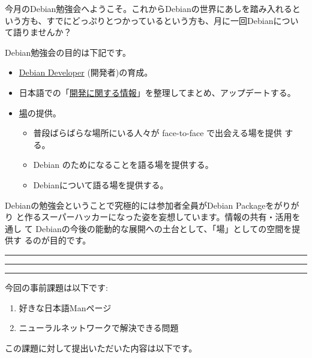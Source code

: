 \documentclass[mingoth,a4paper]{jsarticle}
\begin{document}
\begin{multicols}{2}
 
 
 今月のDebian勉強会へようこそ。これからDebianの世界にあしを踏み入れると
 いう方も、すでにどっぷりとつかっているという方も、月に一回Debianについ
 て語りませんか？

 Debian勉強会の目的は下記です。

 \begin{itemize}
 \item \underline{Debian Developer} (開発者)の育成。
 \item 日本語での「\underline{開発に関する情報}」を整理してまとめ、アップデートする。
 \item \underline{場}の提供。
 \begin{itemize}
  \item 普段ばらばらな場所にいる人々が face-to-face で出会える場を提供
	する。
  \item Debian のためになることを語る場を提供する。
  \item Debianについて語る場を提供する。
 \end{itemize}
 \end{itemize}		

 Debianの勉強会ということで究極的には参加者全員がDebian Packageをがりがり
 と作るスーパーハッカーになった姿を妄想しています。情報の共有・活用を通し
 て Debianの今後の能動的な展開への土台として、「場」としての空間を提供す
 るのが目的です。

\end{multicols}

\newpage

\begin{minipage}[b]{0.2\hsize}
 \colorbox{titleback}{}
\end{minipage}
\begin{minipage}[b]{0.8\hsize}
\hrule
\vspace{2mm}
\hrule
\setcounter{tocdepth}{1} %
\tableofcontents
\vspace{2mm}
\hrule
\end{minipage}


\begin{multicols}{2}

今回の事前課題は以下です:

\begin{enumerate}
 \item 好きな日本語Manページ
 \item ニューラルネットワークで解決できる問題
\end{enumerate}

この課題に対して提出いただいた内容は以下です。


\end{multicols}
\end{document}
